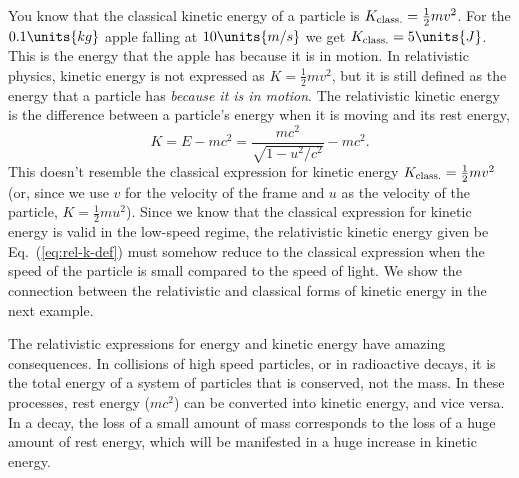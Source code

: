 You know that the classical kinetic energy of a particle is 
$K_{\rm class.}  = \frac{1}{2}mv^2$.  For the $0.1\units{kg}$ 
apple falling at $10\units{m/s}$ we get $K_{\rm class.} = 5\units{J}$.  
This is the energy that the apple has because it is in motion.
In relativistic physics, kinetic energy is not expressed as 
$K = \frac{1}{2}mv^2$,  but it is still defined as the energy that 
a particle has {\em because it is in motion}.  The relativistic 
kinetic energy is the difference between a particle's energy when 
it is moving and its rest energy, 
\begin{equation}
K = E - mc^2 = \frac{mc^2}{\sqrt{1-u^2/c^2}} - mc^2.
\label{eq:rel-k-def}
\end{equation}
This doesn't resemble the classical expression for kinetic
energy $K_{\rm class.} = \frac{1}{2}mv^2$ (or, since we
use $v$ for the velocity of the frame and $u$ as the velocity of the
particle, $K = \frac{1}{2}mu^2$).  Since we know that the classical
expression for kinetic energy is valid in the low-speed regime, the
relativistic kinetic energy given be Eq.~(\ref{eq:rel-k-def}) must
somehow reduce to the classical expression when the speed of the
particle is small compared to the speed of light.  We show the
connection between the relativistic and classical forms of kinetic
energy in the next example.

The relativistic expressions for energy and kinetic energy have 
amazing consequences.  In collisions of high speed particles, or 
in radioactive decays, it is the total energy of a system of 
particles that is conserved, not the mass.  In these processes,
rest energy ($mc^2$) can be converted into kinetic energy, and vice 
versa.  In a decay, the loss of a small amount of mass corresponds to the 
loss of a huge amount of rest energy, which will be manifested 
in a huge increase in kinetic energy. 
 
 





